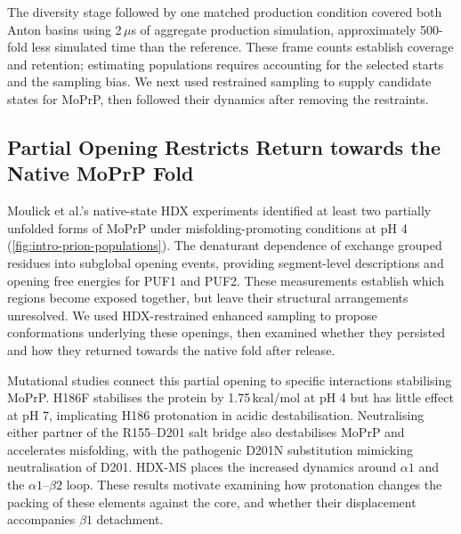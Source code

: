 The diversity stage followed by one matched production condition covered both Anton basins using 2\,$\mu$s of aggregate production simulation, approximately 500-fold less simulated time than the reference. These frame counts establish coverage and retention; estimating populations requires accounting for the selected starts and the sampling bias. We next used restrained sampling to supply candidate states for MoPrP, then followed their dynamics after removing the restraints.

\subsection{Partial Opening Restricts Return towards the Native MoPrP Fold}
\label{sec:biofeat-moprp-results}

Moulick et al.'s native-state HDX experiments identified at least two partially unfolded forms of MoPrP under misfolding-promoting conditions at pH 4 (\cref{fig:intro-prion-populations}).\supercite{moulickPartiallyUnfoldedForms2015} The denaturant dependence of exchange grouped residues into subglobal opening events, providing segment-level descriptions and opening free energies for PUF1 and PUF2. These measurements establish which regions become exposed together, but leave their structural arrangements unresolved. We used HDX-restrained enhanced sampling to propose conformations underlying these openings, then examined whether they persisted and how they returned towards the native fold after release.

Mutational studies connect this partial opening to specific interactions stabilising MoPrP. H186F stabilises the protein by 1.75\,kcal/mol at pH 4 but has little effect at pH 7, implicating H186 protonation in acidic destabilisation. Neutralising either partner of the R155--D201 salt bridge also destabilises MoPrP and accelerates misfolding, with the pathogenic D201N substitution mimicking neutralisation of D201. HDX-MS places the increased dynamics around $\alpha1$ and the $\alpha1$--$\beta2$ loop.\supercite{singhUnravelingMolecularMechanism2016} These results motivate examining how protonation changes the packing of these elements against the core, and whether their displacement accompanies $\beta1$ detachment.

